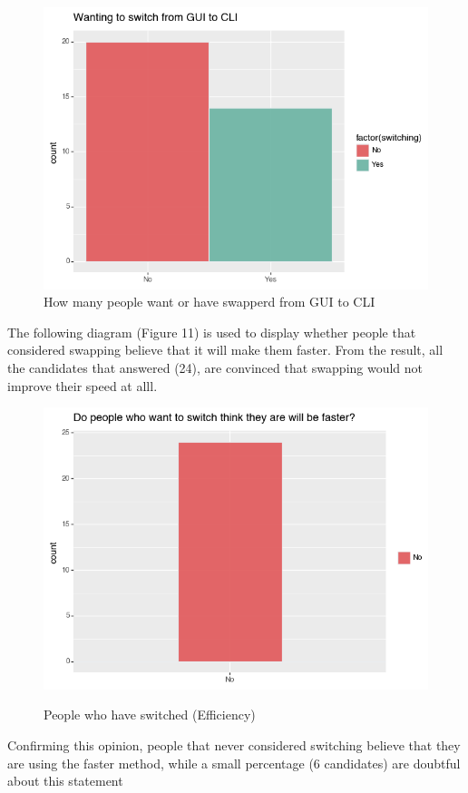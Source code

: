 \documentclass[]{report}
\begin{document}
		\begin{figure}[H]
			\centering
			\includegraphics[width=0.75\linewidth]{SwitchingGUI}
			\caption{How many people want or have swapperd from GUI to CLI}
			\label{fig: 14}
		\end{figure}
		The following diagram (Figure 11) is used to display whether people that considered swapping believe that it will make them faster. From the result, all the candidates that answered (24), are convinced that swapping would not improve their speed at alll.
		\begin{figure}[H]
			\centering
			\includegraphics[width=0.75\linewidth]{EfficientSwitch}\\
			\caption{People who have switched (Efficiency)}
			\label{fig: 9}
		\end{figure}
		Confirming this opinion, people that never considered switching believe that they are using the faster method, while a small percentage (6 candidates) are doubtful about this statement
\end{document}
